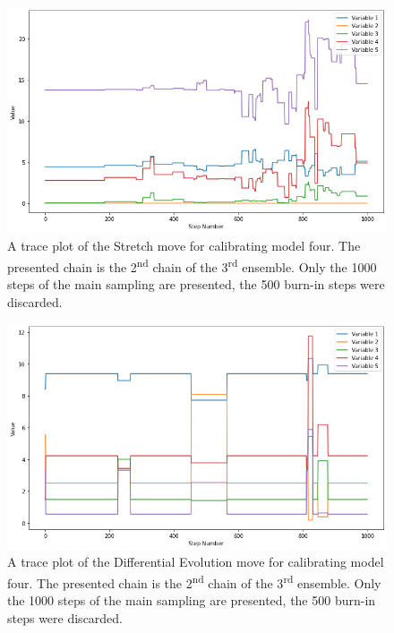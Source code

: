 \begin{figure}[H]
\centering
\includegraphics[width=\textwidth]{Figures/appendix_figs/C.1.1 trace plot Stretch.png}
\caption{A trace plot of the Stretch move for calibrating model four. The presented chain is the 2\textsuperscript{nd} chain of the 3\textsuperscript{rd}  ensemble. Only the 1000 steps of the main sampling are presented, the 500 burn-in steps were discarded. }\label{fig_logbook_1.1_trace_plot_Stretch}
\end{figure}

\begin{figure}[ht]
\centering
\includegraphics[width=\textwidth]{Figures/appendix_figs/C.1.1 trace plot DE.png}
\caption{A trace plot of the Differential Evolution move for calibrating model four. The presented chain is the 2\textsuperscript{nd}
chain of the 3\textsuperscript{rd} ensemble. Only the 1000 steps of the main sampling are presented, the 500 burn-in steps were discarded.}\label{fig_logbook_1.1_trace_plot_DE}
\end{figure}

